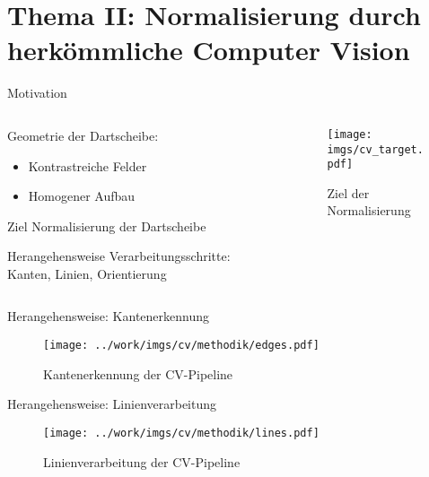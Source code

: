 
\section{Thema II: Normalisierung durch herkömmliche Computer Vision}

\begin{frame}{Motivation}

    \begin{columns}
        \begin{column}{0.6\linewidth}

            Geometrie der Dartscheibe:
            \begin{itemize}
                \item Kontrastreiche Felder
                \item Homogener Aufbau
            \end{itemize}

            \begin{block}{Ziel}
                Normalisierung der Dartscheibe
            \end{block}

            \begin{block}{Herangehensweise}
                Verarbeitungsschritte: Kanten, Linien, Orientierung
            \end{block}

        \end{column}
        \begin{column}{0.4\linewidth}
            \begin{figure}
                \centering
                \texttt{[image: imgs/cv\_target.pdf]}
                \caption{Ziel der Normalisierung}
            \end{figure}
        \end{column}
    \end{columns}
\end{frame}

\begin{frame}{Herangehensweise: Kantenerkennung}
    \begin{figure}
        \centering
        \texttt{[image: ../work/imgs/cv/methodik/edges.pdf]}
        \caption{Kantenerkennung der CV-Pipeline}
    \end{figure}
\end{frame}

\begin{frame}{Herangehensweise: Linienverarbeitung}
    \begin{figure}
        \centering
        \texttt{[image: ../work/imgs/cv/methodik/lines.pdf]}
        \caption{Linienverarbeitung der CV-Pipeline}
    \end{figure}
\end{frame}

